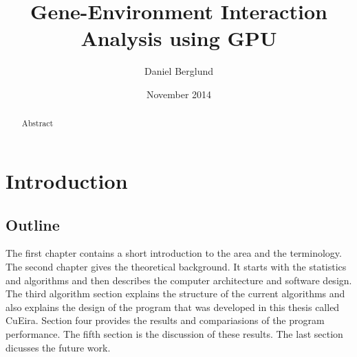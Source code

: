 \documentclass[10pt,a4paper]{report}
\title{Gene-Environment Interaction Analysis using GPU}
\author{Daniel Berglund}
\date{November 2014}
\makeatletter
\newcommand\ackname{Acknowledgements}
\newenvironment{acknowledgements}{
      \titlepage
      \null\vfil
      \@beginparpenalty\@lowpenalty
      \begin{center}%
        \bfseries \ackname
        \@endparpenalty\@M
      \end{center}}%
     {\par\vfil\null\endtitlepage}
\newenvironment{acknowledgements}{
      \if@twocolumn
        \section*{\abstractname}
      \else
        \small
        \begin{center}
          {\bfseries \ackname\vspace{-.5em}\vspace{\z@}}
        \end{center}
        \quotation
      \fi}
      {\if@twocolumn\else\endquotation\fi}
\makeatother
\begin{document}
\maketitle
\thispagestyle{empty}

\clearpage
\thispagestyle{empty}
\begin{abstract}

\end{abstract}

\clearpage
\thispagestyle{empty}
\begin{abstract}
Abstract
\end{abstract}


\clearpage
\tableofcontents
\thispagestyle{empty}

\clearpage
\setcounter{page}{1}
\chapter{Introduction}

\section{Outline}
The first chapter contains a short introduction to the area and the terminology. The second chapter gives the theoretical background. It starts with the statistics and algorithms and then describes the computer architecture and software design. The third algorithm section explains the structure of the current algorithms and also explains the design of the program that was developed in this thesis called CuEira. Section four provides the results and compariasions of the program performance. The fifth section is the discussion of these results. The last section dicusses the future work.


\end{document}
